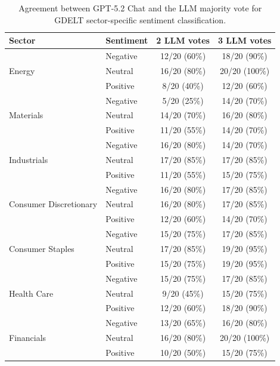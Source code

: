 \begin{table}[ht]
\centering
\caption{Agreement between GPT-5.2 Chat and the LLM majority vote for GDELT sector-specific sentiment classification.}
\label{tab:GDELT_llm_agreement_sector}
\renewcommand{\arraystretch}{1.2}
\begin{tabular}{|l|l|c|c|}
\hline
\textbf{Sector} & \textbf{Sentiment} & \textbf{2 LLM votes} & \textbf{3 LLM votes} \\
\hline

\multirow{3}{*}{Energy}
& Negative & 12/20 (60\%) & 18/20 (90\%) \\
& Neutral  & 16/20 (80\%) & 20/20 (100\%) \\
& Positive & 8/20 (40\%) & 12/20 (60\%) \\
\hline

\multirow{3}{*}{Materials}
& Negative & 5/20 (25\%) & 14/20 (70\%) \\
& Neutral  & 14/20 (70\%) & 16/20 (80\%) \\
& Positive & 11/20 (55\%) & 14/20 (70\%) \\
\hline

\multirow{3}{*}{Industrials}
& Negative & 16/20 (80\%) & 14/20 (70\%) \\
& Neutral  & 17/20 (85\%) & 17/20 (85\%) \\
& Positive & 11/20 (55\%) & 15/20 (75\%) \\
\hline

\multirow{3}{*}{Consumer Discretionary}
& Negative & 16/20 (80\%) & 17/20 (85\%) \\
& Neutral  & 16/20 (80\%) & 17/20 (85\%) \\
& Positive & 12/20 (60\%) & 14/20 (70\%) \\
\hline

\multirow{3}{*}{Consumer Staples}
& Negative & 15/20 (75\%) & 17/20 (85\%) \\
& Neutral  & 17/20 (85\%) & 19/20 (95\%) \\
& Positive & 15/20 (75\%) & 19/20 (95\%) \\
\hline

\multirow{3}{*}{Health Care}
& Negative & 15/20 (75\%) & 17/20 (85\%) \\
& Neutral  & 9/20 (45\%) & 15/20 (75\%) \\
& Positive & 12/20 (60\%) & 18/20 (90\%) \\
\hline

\multirow{3}{*}{Financials}
& Negative & 13/20 (65\%) & 16/20 (80\%) \\
& Neutral  & 16/20 (80\%) & 20/20 (100\%) \\
& Positive & 10/20 (50\%) & 15/20 (75\%) \\
\hline


\end{tabular}
\end{table}
